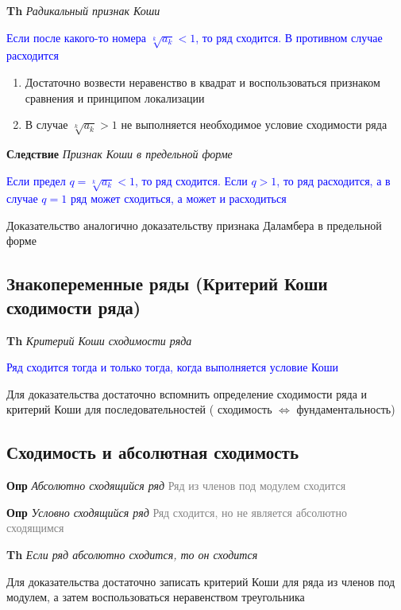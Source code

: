 \textbf{Th} \textit{Радикальный признак Коши}

\textcolor{blue}{Если после какого-то номера $\sqrt[k]{a_k} < 1$,
    то ряд сходится. В противном случае расходится}

\begin{enumerate}
    \item Достаточно возвести неравенство в квадрат и воспользоваться признаком сравнения и принципом локализации
    \item В случае $\sqrt[k]{a_k} > 1$ не выполняется необходимое условие сходимости ряда
\end{enumerate}

\textbf{Следствие} \textit{Признак Коши в предельной форме}

\textcolor{blue}{Если предел $q = \sqrt[k]{a_k} < 1$, то
ряд сходится. Если $q > 1$, то ряд расходится, а в случае $q = 1$ ряд может сходиться, а может и расходиться}

Доказательство аналогично доказательству признака Даламбера в предельной форме

\subsection{Знакопеременные ряды (Критерий Коши сходимости ряда)}

\textbf{Th} \textit{Критерий Коши сходимости ряда}

\textcolor{blue}{Ряд сходится тогда и только тогда, когда
выполняется условие Коши}

Для доказательства достаточно вспомнить определение сходимости ряда и критерий Коши для последовательностей (
сходимость $\Leftrightarrow$ фундаментальность)

\subsection{Сходимость и абсолютная сходимость}

\textbf{Опр} \textit{Абсолютно сходящийся ряд} \textcolor{gray}{Ряд из членов под модулем сходится}

\textbf{Опр} \textit{Условно сходящийся ряд} \textcolor{gray}{Ряд сходится, но не является абсолютно сходящимся}

\textbf{Th} \textit{Если ряд абсолютно сходится, то он сходится}

Для доказательства достаточно записать критерий Коши для ряда из членов под модулем, а затем воспользоваться
неравенством треугольника

